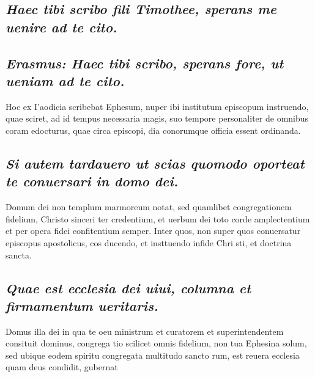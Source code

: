 \documentclass{article}
\begin{document}
\begin{pages}
\subsection*{\textit{Haec tibi scribo fili Timothee, sperans me uenire ad te cito. }}
{}
\subsection*{\textit{Erasmus: Haec tibi scribo, sperans fore, ut ueniam ad te cito. }}\pstart Hoc ex I'aodicia scribebat Ephesum, nuper ibi institutum episcopum instruendo, quae sciret, ad id tempus necessaria magis, suo tempore personaliter de omnibus coram edocturus, quae circa episcopi, dia conorumque officia essent ordinanda.  \pend
{}
{}
\subsection*{\textit{Si autem tardauero ut scias quomodo oporteat te conuersari in domo dei. }}\pstart Domum dei non templum marmoreum notat, sed quamlibet congregationem fidelium, Christo sinceri ter credentium, et uerbum dei toto corde amplectentium et per opera fidei confitentium semper. Inter quos, non super quos conuersatur episcopus apostolicus, cos ducendo, et insttuendo infide Chri sti, et doctrina sancta.  \pend
{}
{}
\subsection*{\textit{Quae est ecclesia dei uiui, columna et firmamentum ueritaris. }}\pstart Domus illa dei in qua te oeu ministrum et curatorem et superintendentem consituit dominus, congrega tio scilicet omnis fidelium, non tua Ephesina solum, sed ubique eodem spiritu congregata multitudo sancto rum, est reuera ecclesia quam deus condidit, gubernat  \pend

\end{pages}
\end{document}
